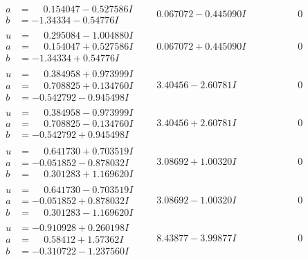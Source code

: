 \documentclass[1p]{elsarticle_modified}
\theoremstyle{definition}
\begin{document}
$$\begin{array}{c|c|c}
\begin{aligned}
a &= \phantom{-}0.154047 - 0.527586 I \\
b &= -1.34334 - 0.54776 I\end{aligned}
 & \phantom{-}0.067072 - 0.445090 I & \phantom{-0.000000 } 0 \\ \hline\begin{aligned}
u &= \phantom{-}0.295084 - 1.004880 I \\
a &= \phantom{-}0.154047 + 0.527586 I \\
b &= -1.34334 + 0.54776 I\end{aligned}
 & \phantom{-}0.067072 + 0.445090 I & \phantom{-0.000000 } 0 \\ \hline\begin{aligned}
u &= \phantom{-}0.384958 + 0.973999 I \\
a &= \phantom{-}0.708825 + 0.134760 I \\
b &= -0.542792 - 0.945498 I\end{aligned}
 & \phantom{-}3.40456 - 2.60781 I & \phantom{-0.000000 } 0 \\ \hline\begin{aligned}
u &= \phantom{-}0.384958 - 0.973999 I \\
a &= \phantom{-}0.708825 - 0.134760 I \\
b &= -0.542792 + 0.945498 I\end{aligned}
 & \phantom{-}3.40456 + 2.60781 I & \phantom{-0.000000 } 0 \\ \hline\begin{aligned}
u &= \phantom{-}0.641730 + 0.703519 I \\
a &= -0.051852 - 0.878032 I \\
b &= \phantom{-}0.301283 + 1.169620 I\end{aligned}
 & \phantom{-}3.08692 + 1.00320 I & \phantom{-0.000000 } 0 \\ \hline\begin{aligned}
u &= \phantom{-}0.641730 - 0.703519 I \\
a &= -0.051852 + 0.878032 I \\
b &= \phantom{-}0.301283 - 1.169620 I\end{aligned}
 & \phantom{-}3.08692 - 1.00320 I & \phantom{-0.000000 } 0 \\ \hline\begin{aligned}
u &= -0.910928 + 0.260198 I \\
a &= \phantom{-}0.58412 + 1.57362 I \\
b &= -0.310722 - 1.237560 I\end{aligned}
 & \phantom{-}8.43877 - 3.99877 I & \phantom{-0.000000 } 0 \\ \hline\begin{aligned}

\end{aligned}
\end{array}$$
\end{document}
